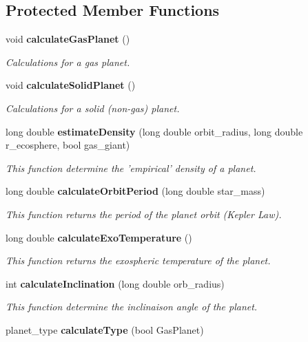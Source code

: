 \subsection*{Protected Member Functions}
\begin{CompactItemize}
\item 
void {\bf calculate\-Gas\-Planet} ()
\begin{CompactList}\small\item\em Calculations for a gas planet. \item\end{CompactList}\item 
void {\bf calculate\-Solid\-Planet} ()
\begin{CompactList}\small\item\em Calculations for a solid (non-gas) planet. \item\end{CompactList}\item 
long double {\bf estimate\-Density} (long double orbit\_\-radius, long double r\_\-ecosphere, bool gas\_\-giant)
\begin{CompactList}\small\item\em This function determine the 'empirical' density of a planet. \item\end{CompactList}\item 
long double {\bf calculate\-Orbit\-Period} (long double star\_\-mass)
\begin{CompactList}\small\item\em This function returns the period of the planet orbit (Kepler Law). \item\end{CompactList}\item 
long double {\bf calculate\-Exo\-Temperature} ()
\begin{CompactList}\small\item\em This function returns the exospheric temperature of the planet. \item\end{CompactList}\item 
int {\bf calculate\-Inclination} (long double orb\_\-radius)
\begin{CompactList}\small\item\em This function determine the inclinaison angle of the planet. \item\end{CompactList}\item 
planet\_\-type {\bf calculate\-Type} (bool Gas\-Planet)

\end{CompactItemize}
